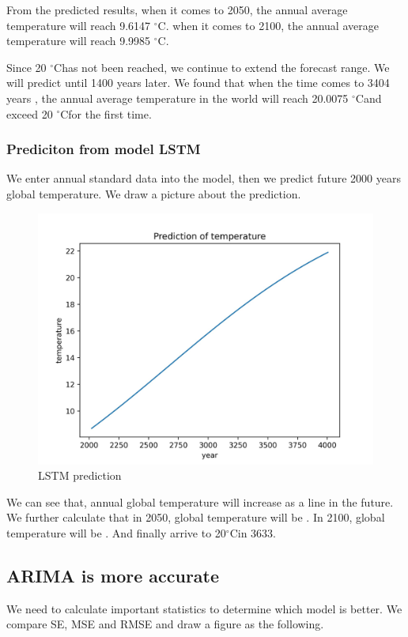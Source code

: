\documentclass{apmcmthesis}
\def\oc{$^{\circ}$C\;}
\begin{document}
From the predicted results, when it comes to 2050, the annual average temperature will reach 9.6147 \oc. when it comes to 2100, the annual average temperature will reach 9.9985 \oc.

Since 20 \oc has not been reached, we continue to extend the forecast range. We will predict until 1400 years later. We found that when the time comes to 3404 years , the annual average temperature in the world will reach 20.0075 \oc and exceed 20 \oc for the first time.

\subsubsection{Prediciton from model LSTM}

We enter annual standard data into the model, then we predict future 2000 years global temperature.
We draw a picture about the prediction.

\begin{figure}[htbp]
  \centering
  \includegraphics[scale=0.15]{LSTM prediction.jpg}
  \caption{LSTM prediction}
\end{figure}

We can see that, annual global temperature will increase as a line in the future.
We further calculate that in 2050, global temperature will be .
In 2100, global temperature will be .
And finally arrive to 20\oc in 3633.


\subsection{ARIMA is more accurate}
We need to calculate important statistics to determine which model is better. 
We compare SE, MSE and RMSE and draw a figure as the following.
\end{document}
